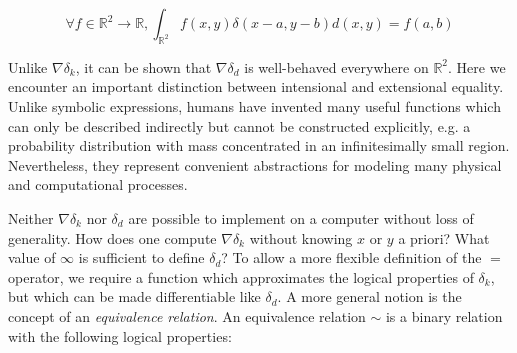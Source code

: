 \documentclass[11pt]{article}
\begin{document}
    $$
    \forall f \in \mathbb{R}^2 \rightarrow \mathbb{R}, \int_{\mathbb{R}^2} f(x,y)\delta(x-a,y-b)d(x, y) = f(a,b)
    $$

    Unlike $\nabla\delta_k$, it can be shown that $\nabla\delta_d$ is well-behaved everywhere on $\mathbb{R}^2$. Here we encounter an important distinction between intensional and extensional equality. Unlike symbolic expressions, humans have invented many useful functions which can only be described indirectly but cannot be constructed explicitly, e.g. a probability distribution with mass concentrated in an infinitesimally small region. Nevertheless, they represent convenient abstractions for modeling many physical and computational processes.

    Neither $\nabla\delta_k$ nor $\delta_d$ are possible to implement on a computer without loss of generality. How does one compute $\nabla\delta_k$ without knowing $x$ or $y$ a priori? What value of $\infty$ is sufficient to define $\delta_d$? To allow a more flexible definition of the $=$ operator, we require a function which approximates the logical properties of $\delta_k$, but which can be made differentiable like $\delta_d$. A more general notion is the concept of an \textit{equivalence relation}. An equivalence relation $\sim$ is a binary relation with the following logical properties:


\end{document}
